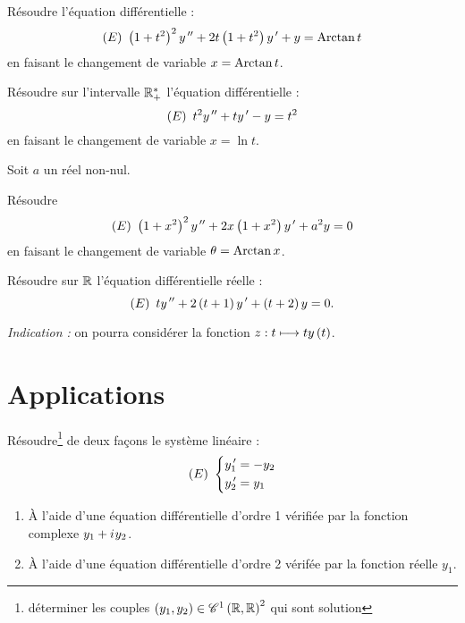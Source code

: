 \begin{exo}[Exercice 11]
Résoudre l'équation différentielle : \[\left(E\right)~\left(1+t^2\right)^2y^{\,\prime\prime}+2t\left(1+t^2\right)y^{\,\prime}+y=\operatorname{Arctan} t\] en faisant le changement de variable \(x=\operatorname{Arctan} t\).
\end{exo}

\begin{corr}
\end{corr}

\begin{exo}[Exercice 12]
Résoudre sur l'intervalle \(\mathbb{R}_+^*\) l'équation différentielle : \[\left(E\right)~t^2y^{\,\prime\prime}+ty^{\,\prime}-y=t^2\] en faisant le changement de variable \(x=\ln t\).
\end{exo}

\begin{corr}
\end{corr}

\begin{exo}
Soit \(a\) un réel non-nul.

Résoudre \[\left(E\right)~\left(1+x^2\right)^2y^{\,\prime\prime}+2x\left(1+x^2\right)y^{\,\prime}+a^2y=0\] en faisant le changement de variable \(\theta=\operatorname{Arctan} x\).
\end{exo}

\begin{corr}
\end{corr}

\begin{exo}[Exercice 14]
Résoudre sur \(\mathbb{R}\) l'équation différentielle réelle : \[\left(E\right)~ty^{\,\prime\prime}+2\left(t+1\right)y^{\,\prime}+\left(t+2\right)y=0.\]

\textit{Indication :} on pourra considérer la fonction \(z:t\longmapsto ty\left(t\right)\).
\end{exo}

\begin{corr}
\end{corr}

\section{Applications}

\begin{exo}[Exercice 15]
Résoudre\footnote{\Cad déterminer les couples \(\left(y_1,y_2\right)\in\mathscr{C}^{1}\left(\mathbb{R},\mathbb{R}\right)^2\) qui sont solution} de deux façons le système linéaire : \[\left(E\right)~\begin{dcases}
y_1^{\,\prime}=-y_2 \\
y_2^{\,\prime}=y_1
\end{dcases}\]

\begin{enumerate}
    \item À l'aide d'une équation différentielle d'ordre 1 vérifiée par la fonction complexe \(y_1+i\mkern1mu y_2\). \\
    \item À l'aide d'une équation différentielle d'ordre 2 vérifée par la fonction réelle \(y_1\).
\end{enumerate}
\end{exo}

